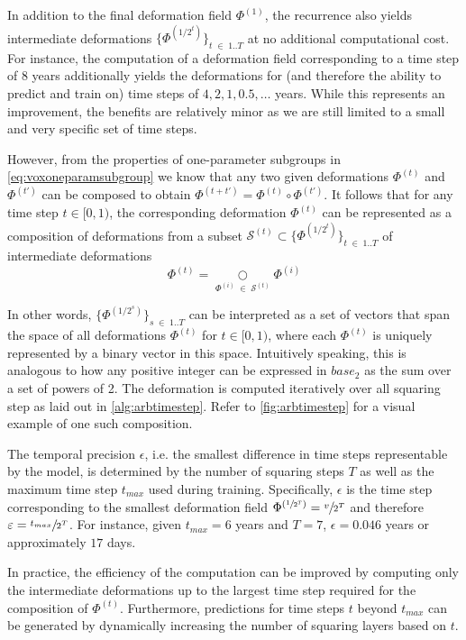 In addition to the final deformation field $\Phi^{(1)}$, the recurrence also yields intermediate deformations $\{ \Phi^{(1 / 2^{t})} \}_{t \; \in \; 1 .. T} $ at no additional computational cost. For instance, the computation of a deformation field corresponding to a time step of 8 years additionally yields the deformations for (and therefore the ability to predict and train on) time steps of ${ 4, 2, 1, 0.5, \ldots }$ years. While this represents an improvement, the benefits are relatively minor as we are still limited to a small and very specific set of time steps.

However, from the properties of one-parameter subgroups in \autoref{eq:voxoneparamsubgroup} we know that any two given deformations $\Phi^{(t)}$ and $\Phi^{(t')}$ can be composed to obtain ${ \Phi^{(t + t')} = \Phi^{(t)} \circ \Phi^{(t')} }$. It follows that for any time step $t \in [0, 1)$, the corresponding deformation $\Phi^{(t)}$ can be represented as a composition of deformations from a subset $\mathcal{S}^{(t)} \subset \{ \Phi^{(1 / 2^{t})} \}_{t \; \in \; 1 .. T} $ of intermediate deformations
\begin{equation}
	\Phi^{(t)} = \underset{\Phi^{(i)} \; \in \; \mathcal{S}^{(t)}}{\bigcirc} \Phi^{(i)}
\end{equation}

In other words, $\{ \Phi^{(1 / 2^{s})} \}_{s \; \in \; 1 .. T}$ can be interpreted as a set of vectors that span the space of all deformations $\Phi^{(t)}$ for $t \in [0, 1)$, where each $\Phi^{(t)}$ is uniquely represented by a binary vector in this space. Intuitively speaking, this is analogous to how any positive integer can be expressed in $base_2$ as the sum over a set of powers of 2. The deformation is computed iteratively over all squaring step as laid out in \autoref{alg:arbtimestep}. Refer to \autoref{fig:arbtimestep} for a visual example of one such composition.

The temporal precision $\epsilon$, i.e. the smallest difference in time steps representable by the model, is determined by the number of squaring steps $T$ as well as the maximum time step $t_{max}$ used during training. Specifically, $\epsilon$ is the time step corresponding to the smallest deformation field $\Phi^{(\sfrac{1}{2^T})} = \sfrac{v}{2^T}$ and therefore $\varepsilon = \sfrac{t_{max}}{2^T}$. For instance, given $t_{max} = 6$ years and $T = 7$, $\epsilon = 0.046$ years or approximately $17$ days.

In practice, the efficiency of the computation can be improved by computing only the intermediate deformations up to the largest time step required for the composition of $\Phi^{(t)}$. Furthermore, predictions for time steps $t$ beyond $t_{max}$ can be generated by dynamically increasing the number of squaring layers based on $t$.

